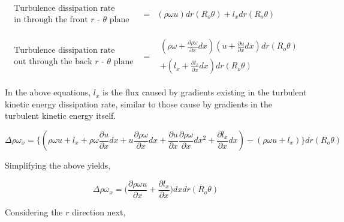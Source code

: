 \begin{displaymath}
	\begin{array}{ccc}
		\begin{array}{c}
			\textrm{Turbulence dissipation rate} \\ \textrm{in through the front $r$ - $\theta$ plane} 
		\end{array} & 
	= & (\rho \omega u)dr(R_o \theta) + l_x dr(R_o \theta)\\
	& \\ & \\
		\begin{array}{c}
			\textrm{Turbulence dissipation rate} \\ \textrm{out through the back $r$ - $\theta$ plane}
		\end{array} & 
	= & \begin{array}{c}
		(\rho \omega + \frac{\partial \rho \omega}{\partial x}dx)(u + \frac{\partial u}{\partial x}dx)dr(R_o \theta) \\
	+ (l_x + \frac{\partial l_x}{\partial x}dx)dr(R_o \theta)
		\end{array}
	\end{array}
\end{displaymath}

	In the above equations, $l_x$ is the flux caused by gradients existing in the turbulent kinetic energy dissipation 
rate, similar to those cause by gradients in the turbulent kinetic energy itself.

\begin{displaymath}
	\Delta \rho \omega_x = \Big\{(\rho \omega u + l_x + \rho \omega \frac{\partial u}{\partial x}dx + u \frac{\partial \rho \omega}
	{\partial x}dx + \frac{\partial u}{\partial x} \frac{\partial \rho \omega}{\partial x}dx^2 + \frac{\partial l_x}
	{\partial x}dx) - (\rho \omega u + l_x)\Big\} dr(R_o \theta)
\end{displaymath}

	Simplifying the above yields,

\begin{displaymath}
	\Delta \rho \omega_x = \Big( \frac{\partial \rho \omega u}{\partial x} + \frac{\partial l_x}{\partial x}
	\Big)dxdr(R_o \theta)
\end{displaymath}

	Considering the $r$ direction next,

